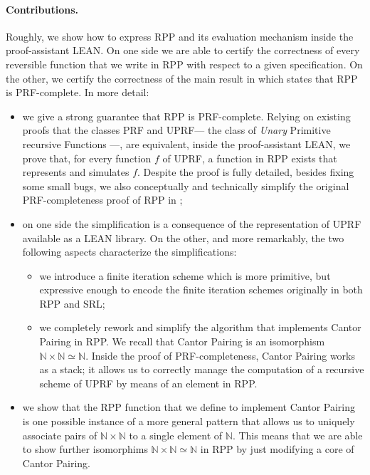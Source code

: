 \documentclass[runningheads]{llncs}
\newcommand{\RPP}{\textsf{RPP}\xspace}
\newcommand{\UPRF}{\textsf{UPRF}\xspace}
\newcommand{\PRF}{\textsf{PRF}\xspace}
\newcommand{\LEAN}{\textsf{LEAN}\xspace}
\newcommand{\SRL}{\textsf{SRL}\xspace}
\begin{document}
\paragraph{Contributions.}
Roughly, we show how to express \RPP and its evaluation mechanism inside the proof-assistant \LEAN \cite{Lean3}. On one side we are able to certify the correctness of every reversible function that we write in \RPP with respect to a given specification. On the other, we certify the correctness of the main result in \cite{DBLP:journals/tcs/PaoliniPR20} which states that \RPP is \PRF-complete. In more detail:
\begin{itemize}
    \item we give a strong guarantee that \RPP is \PRF-complete.
    Relying on existing proofs that the classes \PRF and \UPRF --- the class of \emph{Unary} Primitive recursive Functions ---, are equivalent, inside the proof-assistant \LEAN, we prove that, for every function $ f $ of \UPRF, a function in \RPP exists that represents and simulates $ f $.
    Despite the proof is fully detailed, besides fixing some small bugs, we also conceptually and technically simplify the original \PRF-completeness proof of \RPP in \cite{DBLP:journals/tcs/PaoliniPR20};

    \item on one side the simplification is a consequence of the representation of \UPRF available as a \LEAN library. On the other, and more remarkably,  the two following aspects characterize the simplifications:
    \begin{itemize}
        \item we introduce a finite iteration scheme which is more primitive, but expressive enough to encode the finite iteration schemes originally in both \RPP and \SRL;
        \item we completely rework and simplify the algorithm that implements Cantor Pairing \cite{Cantor1878,DBLP:journals/corr/Szudzik17} in \RPP \cite{DBLP:journals/tcs/PaoliniPR20}.
        We recall that Cantor Pairing is an isomorphism $ \mathbb{N}\times\mathbb{N} \simeq \mathbb{N} $. Inside the proof of \PRF-completeness, Cantor Pairing works as a stack; it allows us to correctly manage the computation of a recursive scheme of \UPRF by means of an element in \RPP.
    \end{itemize}

    \item we show that the \RPP function that we define to implement Cantor Pairing is one possible instance of a more general pattern that allows us to uniquely associate pairs of $ \mathbb{N}\times\mathbb{N}$ to a single element of $ \mathbb{N}$. This means that we are able to show further isomorphims  $ \mathbb{N}\times\mathbb{N}\simeq \mathbb{N}$ in \RPP by just modifying a core of Cantor Pairing.
\end{itemize}
\end{document}
